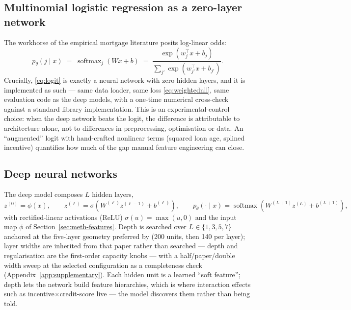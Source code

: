 \subsection{Multinomial logistic regression as a zero-layer network}
\label{subsec:meth-logit}

The workhorse of the empirical mortgage literature posits log-linear
odds:
\begin{equation}
\label{eq:logit}
p_\theta(j \mid x) \;=\; \operatorname{softmax}_j\!\left(Wx + b\right)
\;=\; \frac{\exp\!\left(w_j^\top x + b_j\right)}
{\sum_{j'} \exp\!\left(w_{j'}^\top x + b_{j'}\right)}.
\end{equation}
Crucially, \eqref{eq:logit} is exactly a neural network with zero
hidden layers, and it is implemented as such --- same data loader,
same loss \eqref{eq:weightednll}, same evaluation code as the deep
models, with a one-time numerical cross-check against a standard
library implementation.  This is an experimental-control choice: when
the deep network beats the logit, the difference is attributable to
architecture alone, not to differences in preprocessing, optimisation
or data.  An ``augmented'' logit with hand-crafted nonlinear terms
(squared loan age, splined incentive) quantifies how much of the gap
manual feature engineering can close.

\subsection{Deep neural networks}
\label{subsec:meth-nn}

The deep model composes $L$ hidden layers,
\begin{equation}
\label{eq:mlp}
z^{(0)} = \phi(x), \qquad
z^{(\ell)} = \sigma\!\left(W^{(\ell)} z^{(\ell-1)} + b^{(\ell)}\right),
\qquad
p_\theta(\cdot \mid x) =
\operatorname{softmax}\!\left(W^{(L+1)} z^{(L)} + b^{(L+1)}\right),
\end{equation}
with rectified-linear activations (ReLU) $\sigma(u)=\max(u,0)$ and the
input map $\phi$ of Section~\ref{sec:meth-features}.  Depth is
searched over $L\in\{1,3,5,7\}$ anchored at the five-layer geometry
preferred by \citet{sirignano2021} (200 units, then 140 per layer);
layer widths are inherited from that paper rather than searched ---
depth and regularisation are the first-order capacity knobs --- with
a half/paper/double width sweep at the selected configuration as a
completeness check (Appendix~\ref{app:supplementary}).  Each hidden
unit is a learned ``soft feature''; depth lets the network build
feature hierarchies, which is where interaction effects such as
incentive$\times$credit-score live --- the model discovers them
rather than being told.

